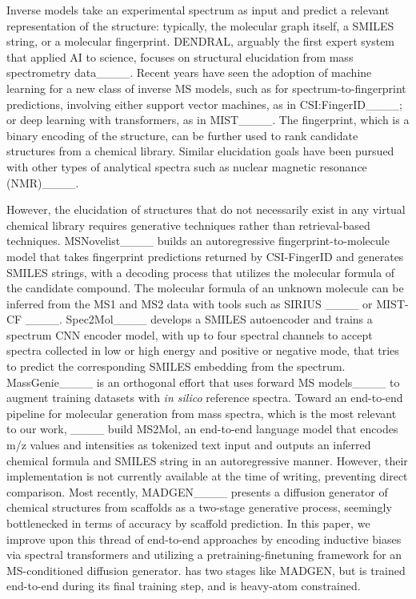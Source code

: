 Inverse models take an experimental spectrum as input and predict a relevant representation of the structure: typically, the molecular graph itself, a SMILES string, or a molecular fingerprint. 
DENDRAL, arguably the first expert system that applied AI to science, focuses on structural elucidation from mass spectrometry data____. 
Recent years have seen the adoption of machine learning for a new class of inverse MS models, such as for spectrum-to-fingerprint predictions, involving either support vector machines, as in CSI:FingerID____; or deep learning with transformers, as in MIST____. The fingerprint, which is a binary encoding of the structure, can be further used to rank candidate structures from a chemical library. Similar elucidation goals have been pursued with other types of analytical spectra such as nuclear magnetic resonance (NMR)____. 

However, the elucidation of structures that do not necessarily exist in any virtual chemical library requires generative techniques rather than retrieval-based techniques. MSNovelist____ builds an autoregressive fingerprint-to-molecule model that takes fingerprint predictions returned by CSI-FingerID and generates SMILES strings, with a decoding process that utilizes the molecular formula of the candidate compound. The molecular formula of an unknown molecule can be inferred from the MS1 and MS2 data with tools such as SIRIUS ____
 or MIST-CF ____. 
Spec2Mol____ develops a SMILES autoencoder and trains a spectrum CNN encoder model, with up to four spectral channels to accept spectra collected in low or high energy and positive or negative mode, that tries to predict the corresponding SMILES embedding from the spectrum. %
MassGenie____ is an orthogonal effort that uses forward MS models____ to augment training datasets with \emph{in silico} reference spectra.
Toward an end-to-end pipeline for molecular generation from mass spectra, which is the most relevant to our work, ____ build MS2Mol, an end-to-end language model that encodes m/z values and intensities as tokenized text input and outputs an inferred chemical formula and SMILES string in an autoregressive manner. However, their implementation is not currently available at the time of writing, preventing direct comparison. Most recently, MADGEN____ presents a diffusion generator of chemical structures from scaffolds as a two-stage generative process, seemingly bottlenecked in terms of accuracy by scaffold prediction. 
In this paper, we improve upon this thread of end-to-end approaches by encoding inductive biases via spectral transformers and utilizing a pretraining-finetuning framework for an MS-conditioned diffusion generator. \ours has two stages like MADGEN, but is trained end-to-end during its final training step, and is heavy-atom constrained.

